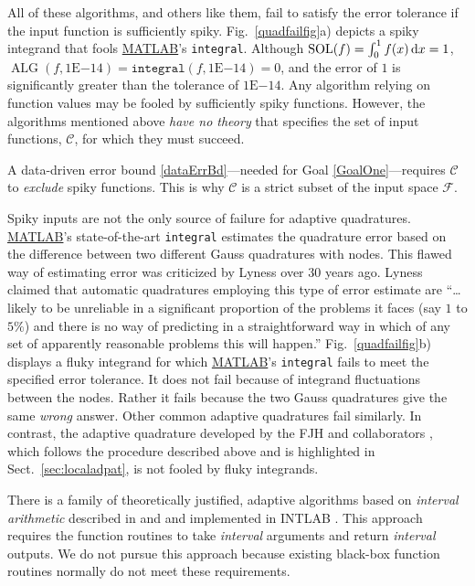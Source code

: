 \documentclass[11pt]{NSFamsart}
\newcommand{\MATLAB}{\hyperlink{MATLABlink}{MATLAB}\xspace}
\DeclareMathOperator{\SOL}{SOL}
\DeclareMathOperator{\ALG}{ALG}
\def\dif{\textup{d}}
\newcommand{\calc}{{\mathcal{C}}}
\newcommand{\calf}{{\mathcal{F}}}
\begin{document}
All of these algorithms, and others like them, fail to satisfy the error tolerance if the input function is sufficiently spiky.  Fig.\ \ref{quadfailfig}a) depicts a spiky integrand that fools \MATLAB's \texttt{integral}.  Although $\SOL(f) = \int_0^1 f(x) \, \dif x = 1$, $\ALG(f,1\text{E}{-14}) = \texttt{integral}(f,1\text{E}{-14}) = 0$, and the error of $1$ is significantly greater than the tolerance of $1\text{E}{-14}$.  Any algorithm relying on function values may be fooled by sufficiently spiky functions.  However, the algorithms mentioned above \emph{have no theory} that specifies the set of input functions, $\calc$, for which they must succeed.

A data-driven error bound \eqref{dataErrBd}---needed for Goal \ref{GoalOne}---requires $\calc$ to \emph{exclude} spiky functions.  This is why $\calc$ is a strict subset of the input space $\calf$.

Spiky inputs are not the only source of failure for adaptive quadratures. 
\MATLAB's state-of-the-art
\texttt{integral} \cite{Sha08a, MAT9.5} estimates the quadrature error based on the difference between two different Gauss quadratures with nodes. This flawed way of estimating error was criticized by 
Lyness \cite[p.\ 69]{Lyn83} over 30 years ago.  Lyness claimed that automatic quadratures employing this type of error estimate are ``\ldots likely to be unreliable in a significant proportion of the problems it faces 
	(say $1$ to $5\%$) and there is no way of predicting in a straightforward way in which of any set
	of apparently reasonable problems this will happen.''
Fig.\ \ref{quadfailfig}b) displays a fluky integrand for which \MATLAB's \texttt{integral} fails to meet the specified error tolerance.  It does not fail because of integrand fluctuations between the nodes.  Rather it fails because the two Gauss quadratures give the same \emph{wrong} answer.  Other common adaptive quadratures fail similarly.  In contrast, the adaptive quadrature developed by the FJH and collaborators \cite{HicEtal14b, Zha18a}, which follows the procedure described above and is highlighted in Sect.\ \ref{sec:localadpat}, is not fooled by fluky integrands.



There is a family of theoretically justified, adaptive algorithms based on \emph{interval 
arithmetic} described in \cite{MoKeCl09} and \cite{Rum10a} and implemented in INTLAB 
\cite{Rum99a}.  This approach requires the function routines to take \emph{interval} arguments 
and return \emph{interval} outputs.  We do not pursue this approach because existing black-box 
function routines normally do not meet these requirements.
\end{document}
